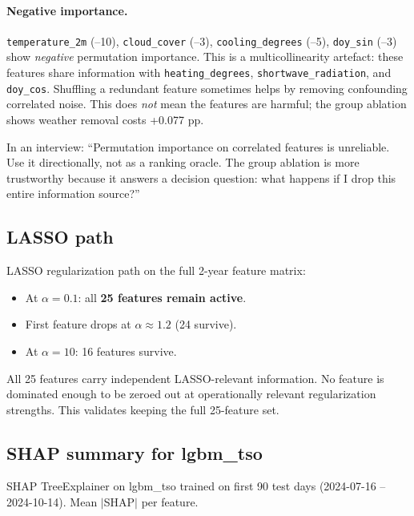 \paragraph{Negative importance.}
\texttt{temperature\_2m} (--10), \texttt{cloud\_cover} (--3),
\texttt{cooling\_degrees} (--5), \texttt{doy\_sin} (--3) show \emph{negative}
permutation importance. This is a multicollinearity artefact: these features
share information with \texttt{heating\_degrees}, \texttt{shortwave\_radiation},
and \texttt{doy\_cos}. Shuffling a redundant feature sometimes helps by
removing confounding correlated noise. This does \emph{not} mean the features
are harmful; the group ablation shows weather removal costs +0.077 pp.

In an interview: ``Permutation importance on correlated features is unreliable.
Use it directionally, not as a ranking oracle. The group ablation is more
trustworthy because it answers a decision question: what happens if I drop this
entire information source?''

\subsection{LASSO path}

LASSO regularization path on the full 2-year feature matrix:

\begin{itemize}
  \item At $\alpha = 0.1$: all \textbf{25 features remain active}.
  \item First feature drops at $\alpha \approx 1.2$ (24 survive).
  \item At $\alpha = 10$: 16 features survive.
\end{itemize}

All 25 features carry independent LASSO-relevant information. No feature is
dominated enough to be zeroed out at operationally relevant regularization
strengths. This validates keeping the full 25-feature set.

\subsection{SHAP summary for lgbm\_tso}
\label{sec:shap}

SHAP TreeExplainer on lgbm\_tso trained on first 90 test days
(2024-07-16 -- 2024-10-14). Mean $|$SHAP$|$ per feature.

